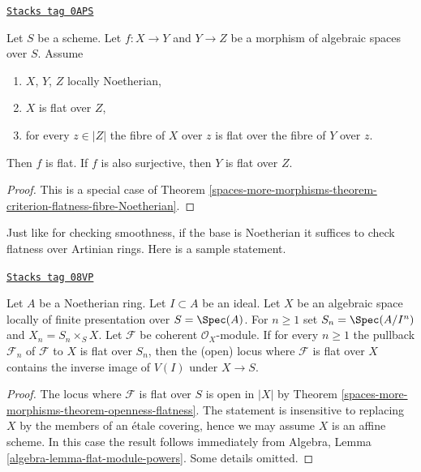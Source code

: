 \begin{lemma}
\label{spaces-more-morphisms-lemma-morphism-between-flat-Noetherian}
\href{https://stacks.math.columbia.edu/tag/0APS}{\texttt{Stacks tag 0APS}}

Let $S$ be a scheme.
Let $f : X \to Y$ and $Y \to Z$ be a morphism of algebraic spaces over $S$.
Assume
\begin{enumerate}
\item $X$, $Y$, $Z$ locally Noetherian,
\item $X$ is flat over $Z$,
\item for every $z \in |Z|$ the fibre of $X$ over $z$
is flat over the fibre of $Y$ over $z$.
\end{enumerate}
Then $f$ is flat. If $f$ is also surjective, then $Y$ is flat over $Z$.
\end{lemma}

\begin{proof}
This is a special case of
Theorem \ref{spaces-more-morphisms-theorem-criterion-flatness-fibre-Noetherian}.
\end{proof}

Just like for checking smoothness, if the base is Noetherian it suffices
to check flatness over Artinian rings. Here is a sample statement.

\begin{lemma}
\label{spaces-more-morphisms-lemma-flatness-over-Noetherian-ring}
\href{https://stacks.math.columbia.edu/tag/08VP}{\texttt{Stacks tag 08VP}}

Let $A$ be a Noetherian ring. Let $I \subset A$ be an ideal.
Let $X$ be an algebraic space locally of finite presentation over
$S = \Spec(A)$. For $n \geq 1$ set $S_n = \Spec(A/I^n)$ and
$X_n = S_n \times_S X$. Let $\mathcal{F}$ be coherent $\mathcal{O}_X$-module.
If for every $n \geq 1$ the pullback $\mathcal{F}_n$ of $\mathcal{F}$ to $X$
is flat over $S_n$, then the (open) locus where $\mathcal{F}$
is flat over $X$ contains the inverse image of $V(I)$ under $X \to S$.
\end{lemma}

\begin{proof}
The locus where $\mathcal{F}$ is flat over $S$ is open in $|X|$ by
Theorem \ref{spaces-more-morphisms-theorem-openness-flatness}.
The statement is insensitive to replacing $X$ by the members of an
\'etale covering, hence we may assume $X$ is an affine scheme.
In this case the result follows immediately from
Algebra, Lemma \ref{algebra-lemma-flat-module-powers}.
Some details omitted.
\end{proof}

